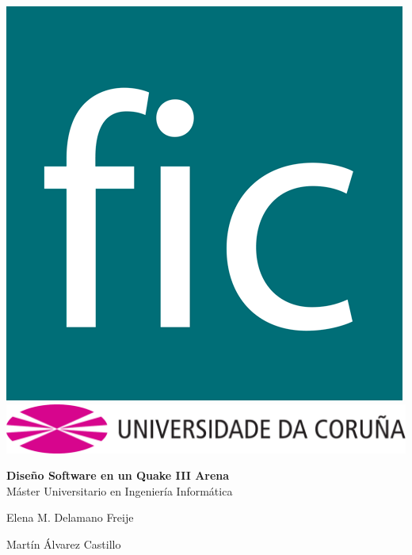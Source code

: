 \documentclass[a4paper,12pt]{report}
\begin{document}
	
	\pagestyle{empty}
	\begin{titlepage}
		\begin{center}
			\includegraphics[scale=0.15]{images/fic01.png} \\ 
			\vspace{2cm} \includegraphics[scale=.4]{images/udc.pdf} \\
			
			
			\vspace{2.5cm}
			
			\textbf{\Large Diseño Software en un Quake III Arena}\\
			\vspace{0.5cm}
			\large{Máster Universitario en Ingeniería Informática}\\
		\end{center}
		
		\vspace{7.2cm}
		\begin{flushright}
			\noindent Elena M. Delamano Freije
			
			\noindent Martín Álvarez Castillo
			
		\end{flushright}
	\end{titlepage}
	\clearpage
	
\end{document}
